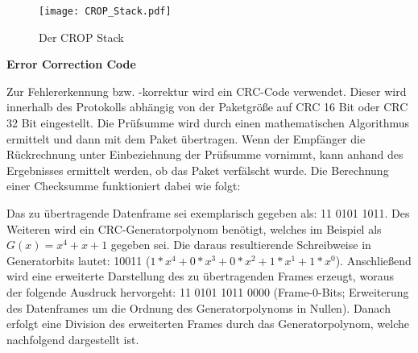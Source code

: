 \begin{figure}[H]
\centering
\texttt{[image: CROP\_Stack.pdf]}
\caption{Der CROP Stack}
\label{fig:CROP_Stack}
\end{figure}

\textbf{Error Correction Code}

Zur Fehlererkennung bzw. -korrektur wird ein CRC-Code verwendet. Dieser wird
innerhalb des Protokolls abhängig von der Paketgr{\"o}{\ss}e auf CRC 16 Bit oder
CRC 32 Bit eingestellt. Die Pr{\"u}fsumme wird durch einen mathematischen
Algorithmus ermittelt und dann mit dem Paket {\"u}bertragen. Wenn der
Empf{\"a}nger die R{\"u}ckrechnung unter Einbeziehnung der Pr{\"u}fsumme
vornimmt, kann anhand des Ergebnisses ermittelt werden, ob das Paket
verf{\"a}lscht wurde. Die Berechnung einer Checksumme funktioniert dabei wie
folgt:

Das zu {\"u}bertragende Datenframe sei exemplarisch gegeben als: 11 0101 1011.
Des Weiteren wird ein CRC-Generatorpolynom ben{\"o}tigt, welches im Beispiel als
$G(x) = x^4 + x + 1$ gegeben sei. Die daraus resultierende Schreibweise in Generatorbits lautet: 10011
($1*x^4+0*x^3+0*x^2+1*x^1+1*x^0$).
Anschließend wird eine erweiterte Darstellung des zu {\"u}bertragenden Frames
erzeugt, woraus der folgende Ausdruck hervorgeht: 11 0101 1011 0000
(Frame-0-Bits; Erweiterung des Datenframes um die Ordnung des Generatorpolynoms
in Nullen). Danach erfolgt eine Division des erweiterten Frames durch das
Generatorpolynom, welche nachfolgend dargestellt ist.

\makeatletter
\def\cline#1{\noalign{\vskip-2ex}\@cline#1\@nil}
\makeatother

